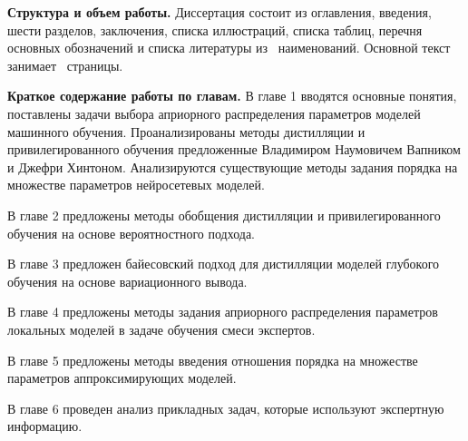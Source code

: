 \vspace{0.5cm}
\textbf{Структура и объем работы.} Диссертация состоит из оглавления, введения, шести разделов, заключения, списка иллюстраций, списка таблиц, перечня основных обозначений и списка литературы из~ наименований. Основной текст занимает~\pageref{LastPage} страницы.

\vspace{0.5cm}
\textbf{Краткое содержание работы по главам.}
В главе 1 вводятся основные понятия, поставлены задачи выбора априорного распределения параметров моделей машинного обучения. Проанализированы методы дистилляции и привилегированного обучения предложенные Владимиром Наумовичем Вапником и Джефри Хинтоном. Анализируются существующие методы задания порядка на множестве параметров нейросетевых моделей.
 
В главе 2 предложены методы обобщения дистилляции и привилегированного обучения на основе вероятностного подхода.

В главе 3 предложен байесовский подход для дистилляции моделей глубокого обучения на основе вариационного вывода.

В главе 4 предложены методы задания априорного распределения параметров локальных моделей в задаче обучения смеси экспертов.

В главе 5 предложены методы введения отношения порядка на множестве параметров аппроксимирующих моделей.

В главе 6 проведен анализ прикладных задач, которые используют экспертную информацию.




